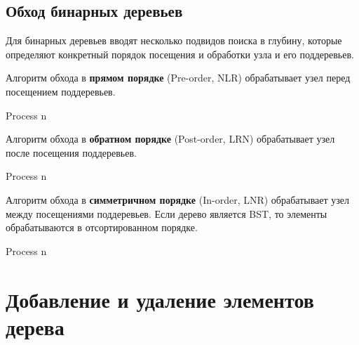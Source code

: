 \subsection{Обход бинарных деревьев}
\label{sec:bintree-traversal}
Для бинарных деревьев вводят несколько подвидов поиска в глубину,
которые определяют конкретный порядок посещения и обработки узла и его поддеревьев.

Алгоритм обхода в \textbf{прямом порядке} (Pre-order, NLR) обрабатывает узел перед
посещением поддеревьев.
\begin{algorithmic}
    \State Process n
      \State {}
    \EndIf
      \State {}
    \EndIf
  \EndFunction
\end{algorithmic}

Алгоритм обхода в \textbf{обратном порядке} (Post-order, LRN) обрабатывает узел после
посещения поддеревьев.
\begin{algorithmic}
      \State {}
    \EndIf
      \State {}
    \EndIf
    \State Process n
  \EndFunction
\end{algorithmic}

Алгоритм обхода в \textbf{симметричном порядке} (In-order, LNR) обрабатывает узел между
посещениями поддеревьев. Если дерево является BST, то элементы обрабатываются в отсортированном
порядке.
\begin{algorithmic}
      \State {}
    \EndIf
    \State Process n
      \State {}
    \EndIf
  \EndFunction
\end{algorithmic}

\section{Добавление и удаление элементов дерева}
\label{sec:tree-ins-del}
